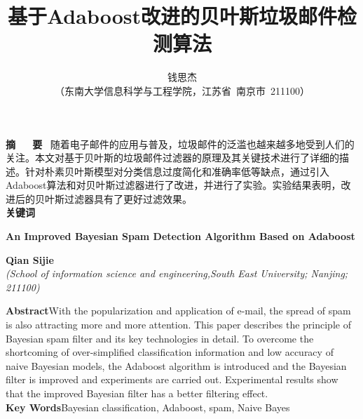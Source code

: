\documentclass[a4paper,11pt,onecolumn,twoside]{article}
\title{\huge{基于Adaboost改进的贝叶斯垃圾邮件检测算法}}
\author{钱思杰\\[2pt]
\normalsize
（东南大学信息科学与工程学院，江苏省~南京市~211100） \\[2pt]}
\begin{document}
\newcommand{\supercite}[1]{\textsuperscript{\cite{#1}}}
\maketitle

\setlength{\oddsidemargin}{1cm}
\setlength{\evensidemargin}{\oddsidemargin}
\setlength{\textwidth}{13.50cm}
\vspace{-.8cm}
\begin{center}
\parbox{\textwidth}{
\textbf{摘~~~要} \quad ~{\kaishu  随着电子邮件的应用与普及，垃圾邮件的泛滥也越来越多地受到人们的关注。本文对基于贝叶斯的垃圾邮件过滤器的原理及其关键技术进行了详细的描述。针对朴素贝叶斯模型对分类信息过度简化和准确率低等缺点，通过引入Adaboost算法和对贝叶斯过滤器进行了改进，并进行了实验。实验结果表明，改进后的贝叶斯过滤器具有了更好过滤效果。}\\
\textbf{关键词} \\}
\end{center}

\vspace{.1cm}
\begin{center}
\parbox{\textwidth}{

\begin{center}
	{\Large{\textbf{An Improved Bayesian Spam Detection Algorithm Based on Adaboost}}}
\end{center}

\vspace{-0.5cm}
\begin{center}
\textbf{Qian Sijie}\\[2pt]
\small{\textit{(School of information science and engineering,South East University; Nanjing; 211100)}}\\[2pt]
\end{center}
{\small{\textbf{Abstract}\quad With the popularization and application of e-mail, the spread of spam is also attracting more and more attention. This paper describes the principle of Bayesian spam filter and its key technologies in detail. To overcome the shortcoming of over-simplified classification information and low accuracy of naive Bayesian models, the Adaboost algorithm is introduced and the Bayesian filter is improved and experiments are carried out. Experimental results show that the improved Bayesian filter has a better filtering effect.\\
\textbf{Key Words}\quad Bayesian classification, Adaboost, spam, Naive Bayes}}
}
\end{center}
\end{document}
